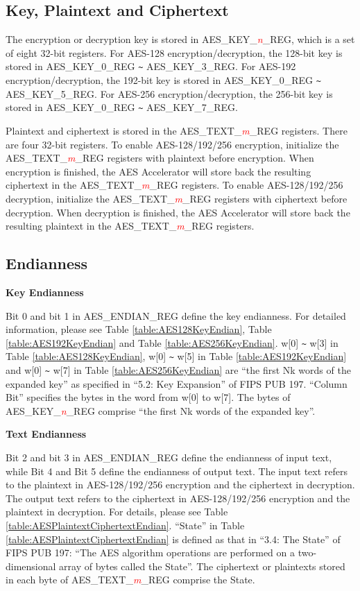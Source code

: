 \documentclass[main\_\_EN.tex]{subfiles}
\begin{document}
\subsection{Key, Plaintext and Ciphertext}

The encryption or decryption key is stored in AES\_KEY\_\textcolor{red}{\it{n}}\_REG, which is a set of eight 32-bit registers.
For AES-128 encryption/decryption, the 128-bit key is stored in AES\_KEY\_0\_REG \verb+~+ AES\_KEY\_3\_REG.
For AES-192 encryption/decryption, the 192-bit key is stored in AES\_KEY\_0\_REG \verb+~+ AES\_KEY\_5\_REG.
For AES-256 encryption/decryption, the 256-bit key is stored in AES\_KEY\_0\_REG \verb+~+ AES\_KEY\_7\_REG.

Plaintext and ciphertext is stored in the AES\_TEXT\_\textcolor{red}{\it{m}}\_REG registers. There are four 32-bit registers.
To enable AES-128/192/256 encryption, initialize the AES\_TEXT\_\textcolor{red}{\it{m}}\_REG registers with plaintext before encryption. When encryption is finished, the AES Accelerator will store back the resulting ciphertext in the AES\_TEXT\_\textcolor{red}{\it{m}}\_REG registers. To enable AES-128/192/256 decryption, initialize the AES\_TEXT\_\textcolor{red}{\it{m}}\_REG registers with ciphertext before decryption. When decryption is finished, the AES Accelerator will store back the resulting plaintext in the AES\_TEXT\_\textcolor{red}{\it{m}}\_REG registers.


\subsection{Endianness}

\textbf{Key Endianness}

Bit 0 and bit 1 in AES\_ENDIAN\_REG define the key endianness. For detailed information, please see Table \ref{table:AES128KeyEndian}, Table \ref{table:AES192KeyEndian} and Table \ref{table:AES256KeyEndian}.
w[0] \verb+~+ w[3] in Table \ref{table:AES128KeyEndian},
w[0] \verb+~+ w[5] in Table \ref{table:AES192KeyEndian} and w[0] \verb+~+ w[7] in Table \ref{table:AES256KeyEndian} are “the first Nk words of the expanded key” as specified in “5.2: Key Expansion” of FIPS PUB 197. “Column Bit” specifies the bytes in the word from w[0] to w[7]. The bytes of AES\_KEY\_\textcolor{red}{\it{n}}\_REG comprise “the first Nk words of the expanded key”.

\textbf{Text Endianness}

Bit 2 and bit 3 in AES\_ENDIAN\_REG define the endianness of input text, while Bit 4 and Bit 5 define the endianness of output text.
The input text refers to the plaintext in AES-128/192/256 encryption and the ciphertext in decryption.
The output text refers to the ciphertext in AES-128/192/256 encryption and the plaintext in decryption.
For details, please see Table \ref{table:AESPlaintextCiphertextEndian}.
“State” in Table \ref{table:AESPlaintextCiphertextEndian} is defined as that in “3.4: The State” of FIPS PUB 197: “The AES algorithm operations are performed on a two-dimensional array of bytes called the State”.
The ciphertext or plaintexts stored in each byte of AES\_TEXT\_\textcolor{red}{\it{m}}\_REG comprise the State.
\end{document}
